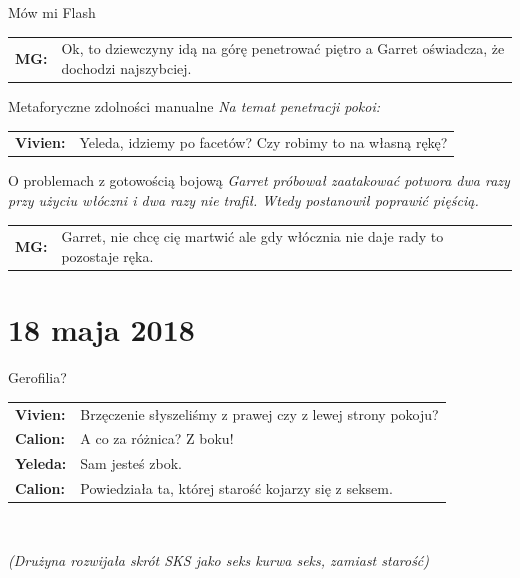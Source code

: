 \documentclass[10pt,twoside,twocolumn]{book}
\begin{document}
\begin{rpg-quotebox}{Mów mi Flash}
   \begin{tabularx}{\columnwidth}{lX}
      \textbf{MG:} & Ok, to dziewczyny idą na górę penetrować piętro a Garret oświadcza, że dochodzi najszybciej.\\
   \end{tabularx}
\end{rpg-quotebox}


\begin{rpg-quotebox}{Metaforyczne zdolności manualne}
   \textit{Na temat penetracji pokoi:}\\

   \begin{tabularx}{\columnwidth}{lX}
      \textbf{Vivien:} &  Yeleda, idziemy po facetów? Czy robimy to na własną rękę?\\
   \end{tabularx}
\end{rpg-quotebox}


\begin{rpg-quotebox}{O problemach z gotowością bojową}
   \textit{Garret próbował zaatakować potwora dwa razy przy użyciu włóczni i dwa razy nie trafił. Wtedy postanowił poprawić pięścią.}\\

   \begin{tabularx}{\columnwidth}{lX}
      \textbf{MG:} & Garret, nie chcę cię martwić ale gdy włócznia nie daje rady to pozostaje ręka.\\
   \end{tabularx}
\end{rpg-quotebox}


\section{18 maja 2018}


\begin{rpg-quotebox}{Gerofilia?}
   \begin{tabularx}{\columnwidth}{lX}
      \textbf{Vivien:} & Brzęczenie słyszeliśmy z prawej czy z lewej strony pokoju?\\
      \textbf{Calion:} & A co za różnica? Z boku!\\
      \textbf{Yeleda:} & Sam jesteś zbok.\\
      \textbf{Calion:} & Powiedziała ta, której starość kojarzy się z seksem.\\
   \end{tabularx}
   ~\newline

   \textit{(Drużyna rozwijała skrót SKS jako seks kurwa seks, zamiast starość)}\\
\end{rpg-quotebox}
\end{document}
